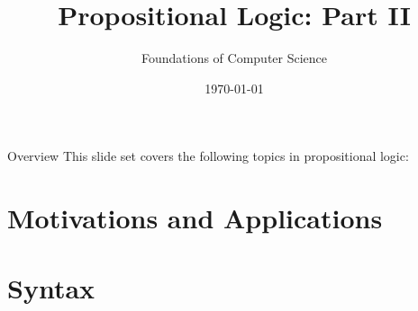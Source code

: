 \documentclass[style=sailor,size=12pt]{powerdot}
\title{Propositional Logic: Part II}
\author{Foundations of Computer Science}
\date{\today}
\begin{document}
\maketitle
\begin{slide}[toc=,bm=]{Overview}
This slide set covers the following topics in propositional logic:

\vspace{5mm}
\tableofcontents[content=sections]
\end{slide}

\section[slide=true]{Motivations and Applications}


\section[slide=true]{Syntax}

\end{document}
